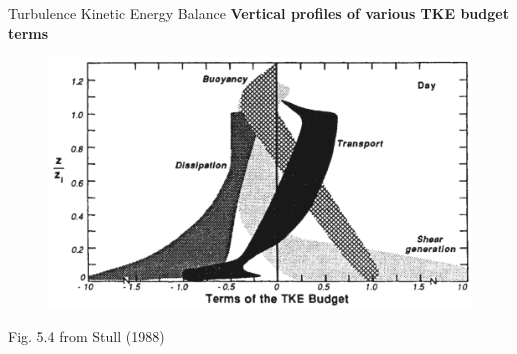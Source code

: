 \begin{frame}{Turbulence Kinetic Energy Balance}
\textbf{Vertical profiles of various TKE budget terms}
\begin{figure}
	\includegraphics[width=\textwidth]{budget1}	
\end{figure}
\centering \tiny{Fig. 5.4 from Stull (1988)}
\end{frame}
